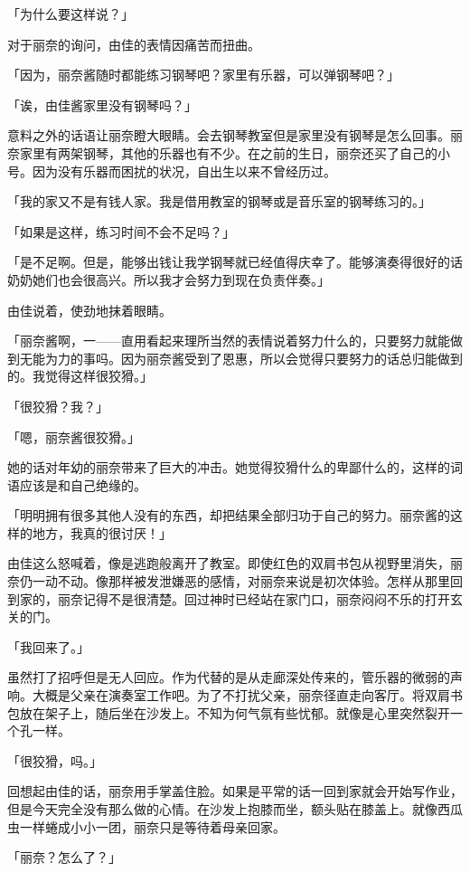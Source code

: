 \documentclass[UTF8]{ctexart}
\begin{document}
    「为什么要这样说？」

    对于丽奈的询问，由佳的表情因痛苦而扭曲。

    「因为，丽奈酱随时都能练习钢琴吧？家里有乐器，可以弹钢琴吧？」

    「诶，由佳酱家里没有钢琴吗？」

    意料之外的话语让丽奈瞪大眼睛。会去钢琴教室但是家里没有钢琴是怎么回事。丽奈家里有两架钢琴，其他的乐器也有不少。在之前的生日，丽奈还买了自己的小号。因为没有乐器而困扰的状况，自出生以来不曾经历过。

    「我的家又不是有钱人家。我是借用教室的钢琴或是音乐室的钢琴练习的。」

    「如果是这样，练习时间不会不足吗？」

    「是不足啊。但是，能够出钱让我学钢琴就已经值得庆幸了。能够演奏得很好的话奶奶她们也会很高兴。所以我才会努力到现在负责伴奏。」

    由佳说着，使劲地抹着眼睛。

    「丽奈酱啊，一——直用看起来理所当然的表情说着努力什么的，只要努力就能做到无能为力的事吗。因为丽奈酱受到了恩惠，所以会觉得只要努力的话总归能做到的。我觉得这样很狡猾。」

    「很狡猾？我？」

    「嗯，丽奈酱很狡猾。」

    她的话对年幼的丽奈带来了巨大的冲击。她觉得狡猾什么的卑鄙什么的，这样的词语应该是和自己绝缘的。

    「明明拥有很多其他人没有的东西，却把结果全部归功于自己的努力。丽奈酱的这样的地方，我真的很讨厌！」

    由佳这么怒喊着，像是逃跑般离开了教室。即使红色的双肩书包从视野里消失，丽奈仍一动不动。像那样被发泄嫌恶的感情，对丽奈来说是初次体验。怎样从那里回到家的，丽奈记得不是很清楚。回过神时已经站在家门口，丽奈闷闷不乐的打开玄关的门。

    「我回来了。」

    虽然打了招呼但是无人回应。作为代替的是从走廊深处传来的，管乐器的微弱的声响。大概是父亲在演奏室工作吧。为了不打扰父亲，丽奈径直走向客厅。将双肩书包放在架子上，随后坐在沙发上。不知为何气氛有些忧郁。就像是心里突然裂开一个孔一样。

    「很狡猾，吗。」

    回想起由佳的话，丽奈用手掌盖住脸。如果是平常的话一回到家就会开始写作业，但是今天完全没有那么做的心情。在沙发上抱膝而坐，额头贴在膝盖上。就像西瓜虫一样蜷成小小一团，丽奈只是等待着母亲回家。

    「丽奈？怎么了？」
\end{document}
